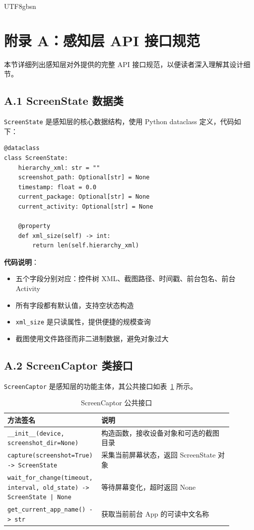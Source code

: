 \documentclass{article}
\begin{document}
\begin{CJK}{UTF8}{gbsn}
\section*{附录 A：感知层 API 接口规范}

本节详细列出感知层对外提供的完整 API 接口规范，以便读者深入理解其设计细节。

\subsection*{A.1 ScreenState 数据类}

\texttt{ScreenState} 是感知层的核心数据结构，使用 Python dataclass 定义，代码如下：

\begin{verbatim}
@dataclass
class ScreenState:
    hierarchy_xml: str = ""
    screenshot_path: Optional[str] = None
    timestamp: float = 0.0
    current_package: Optional[str] = None
    current_activity: Optional[str] = None

    @property
    def xml_size(self) -> int:
        return len(self.hierarchy_xml)
\end{verbatim}

\textbf{代码说明}：
\begin{itemize}
  \item 五个字段分别对应：控件树 XML、截图路径、时间戳、前台包名、前台 Activity
  \item 所有字段都有默认值，支持空状态构造
  \item \texttt{xml\_size} 是只读属性，提供便捷的规模查询
  \item 截图使用文件路径而非二进制数据，避免对象过大
\end{itemize}

\subsection*{A.2 ScreenCaptor 类接口}

\texttt{ScreenCaptor} 是感知层的功能主体，其公共接口如表~\ref{tab:api_screencaptor} 所示。

\begin{table}[h]
  \centering
  \caption{ScreenCaptor 公共接口}
  \label{tab:api_screencaptor}
  \begin{tabular}{p{0.32\linewidth}p{0.58\linewidth}}
    \toprule
    方法签名 & 说明 \\
    \midrule
    \texttt{\_\_init\_\_(device, screenshot\_dir=None)} & 构造函数，接收设备对象和可选的截图目录 \\
    \texttt{capture(screenshot=True) -> ScreenState} & 采集当前屏幕状态，返回 ScreenState 对象 \\
    \texttt{wait\_for\_change(timeout, interval, old\_state) -> ScreenState | None} & 等待屏幕变化，超时返回 None \\
    \texttt{get\_current\_app\_name() -> str} & 获取当前前台 App 的可读中文名称 \\
    \bottomrule
  \end{tabular}
\end{table}


\end{CJK}
\end{document}

